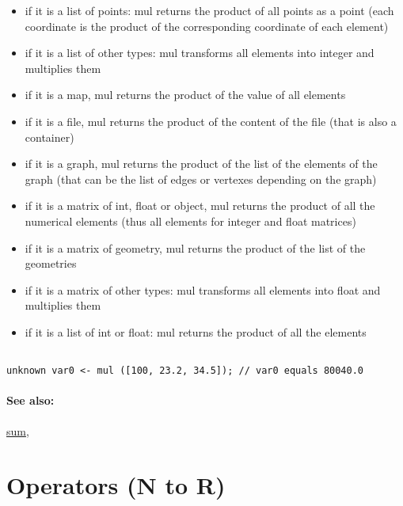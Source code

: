 \documentclass[]{book}
\providecommand{\tightlist}{%
  \setlength{\itemsep}{0pt}\setlength{\parskip}{0pt}}
\theoremstyle{definition}
\theoremstyle{definition}
\theoremstyle{definition}
\theoremstyle{remark}
\begin{document}
\begin{itemize}
\tightlist
\item
  if it is a list of points: mul returns the product of all points as a
  point (each coordinate is the product of the corresponding coordinate
  of each element)\\
\item
  if it is a list of other types: mul transforms all elements into
  integer and multiplies them\\
\item
  if it is a map, mul returns the product of the value of all elements\\
\item
  if it is a file, mul returns the product of the content of the file
  (that is also a container)\\
\item
  if it is a graph, mul returns the product of the list of the elements
  of the graph (that can be the list of edges or vertexes depending on
  the graph)\\
\item
  if it is a matrix of int, float or object, mul returns the product of
  all the numerical elements (thus all elements for integer and float
  matrices)\\
\item
  if it is a matrix of geometry, mul returns the product of the list of
  the geometries\\
\item
  if it is a matrix of other types: mul transforms all elements into
  float and multiplies them\\
\item
  if it is a list of int or float: mul returns the product of all the
  elements
\end{itemize}

\begin{verbatim}
 
unknown var0 <- mul ([100, 23.2, 34.5]); // var0 equals 80040.0
\end{verbatim}

\subsubsection{See also:}\label{see-also-144}

\href{OperatorsSZ\#sum}{sum},

\chapter{Operators (N to R)}\label{operators-n-to-r}
\end{document}
